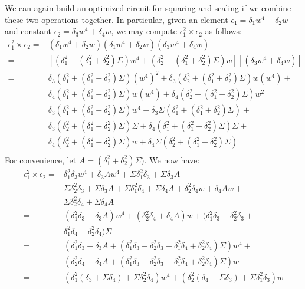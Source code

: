 We can again build an optimized circuit for squaring and scaling if we combine these two operations together. In particular, given an element $\epsilon_1 = \delta_1 w^4 + \delta_2 w$ and constant $\epsilon_2 = \delta_3 w^4 + \delta_4 w$, we may compute $\epsilon_1^2 \times \epsilon_2$ as follows:
\begin{align*}
\epsilon_1^2 \times \epsilon_2 = & (\delta_1 w^4 + \delta_2 w)(\delta_1 w^4 + \delta_2 w)(\delta_3 w^4 + \delta_4 w) \\
= & [(\delta_1^2 + (\delta_1^2 + \delta_2^2)\Sigma) w^4 + (\delta_2^2 + (\delta_1^2 + \delta_2^2)\Sigma) w][(\delta_3 w^4 + \delta_4 w)]\\
= & \delta_3(\delta_1^2 + (\delta_1^2 + \delta_2^2)\Sigma)(w^4)^2 + \delta_3(\delta_2^2 + (\delta_1^2 + \delta_2^2)\Sigma)w(w^4) + \\
& \delta_4(\delta_1^2 + (\delta_1^2 + \delta_2^2)\Sigma)w(w^4) + \delta_4(\delta_2^2 + (\delta_1^2 + \delta_2^2)\Sigma)w^2 \\
= & \delta_3(\delta_1^2 + (\delta_1^2 + \delta_2^2)\Sigma)w^4 + \delta_3\Sigma(\delta_1^2 + (\delta_1^2 + \delta_2^2)\Sigma) + \\
& \delta_3(\delta_2^2 + (\delta_1^2 + \delta_2^2)\Sigma)\Sigma + \delta_4(\delta_1^2 + (\delta_1^2 + \delta_2^2)\Sigma)\Sigma + \\
& \delta_4(\delta_2^2 + (\delta_1^2 + \delta_2^2)\Sigma)w + \delta_4\Sigma(\delta_2^2 + (\delta_1^2 + \delta_2^2)\Sigma) \\
\end{align*}
For convenience, let $A = (\delta_1^2 + \delta_2^2)\Sigma)$. We now have:
\begin{align*}
\epsilon_1^2 \times \epsilon_2 = & \delta_1^2\delta_3 w^4 + \delta_3A w^4 + \Sigma\delta_1^2\delta_3 + \Sigma\delta_3A + \\
& \Sigma\delta_2^2\delta_3 + \Sigma\delta_3A + \Sigma\delta_1^2\delta_4 + \Sigma\delta_4A + \delta_2^2\delta_4 w + \delta_4A w + \\
& \Sigma\delta_2^2\delta_4 + \Sigma\delta_4A \\
= & (\delta_1^2\delta_3 + \delta_3A) w^4 + (\delta_2^2\delta_4 + \delta_4A) w + (\delta_1^2\delta_3 + \delta_2^2\delta_3 + \\
& \delta_1^2\delta_4 + \delta_2^2\delta_4)\Sigma \\
= & (\delta_1^2\delta_3 + \delta_3A + (\delta_1^2\delta_3 + \delta_2^2\delta_3 + \delta_1^2\delta_4 + \delta_2^2\delta_4)\Sigma) w^4 + \\
& (\delta_2^2\delta_4 + \delta_4A + (\delta_1^2\delta_3 + \delta_2^2\delta_3 + \delta_1^2\delta_4 + \delta_2^2\delta_4)\Sigma) w \\
= & (\delta_1^2(\delta_3 + \Sigma\delta_4) + \Sigma\delta_2^2\delta_4) w^4 + (\delta_2^2(\delta_4 + \Sigma\delta_3) + \Sigma\delta_1^2\delta_3) w
\end{align*}
